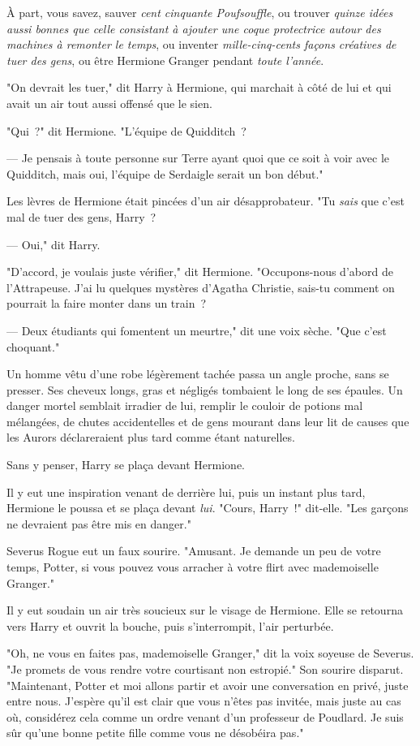 À part, vous savez, sauver \emph{cent cinquante Poufsouffle}, ou trouver \emph{quinze idées aussi bonnes que celle consistant à ajouter une coque protectrice autour des machines à remonter le temps}, ou inventer \emph{mille-cinq-cents façons créatives de tuer des gens}, ou être Hermione Granger pendant \emph{toute l'année}.

"On devrait les tuer," dit Harry à Hermione, qui marchait à côté de lui et qui avait un air tout aussi offensé que le sien.

"Qui~?" dit Hermione. "L'équipe de Quidditch~?

--- Je pensais à toute personne sur Terre ayant quoi que ce soit à voir avec le Quidditch, mais oui, l'équipe de Serdaigle serait un bon début."

Les lèvres de Hermione était pincées d'un air désapprobateur. "Tu \emph{sais} que c'est mal de tuer des gens, Harry~?

--- Oui," dit Harry.

"D'accord, je voulais juste vérifier," dit Hermione. "Occupons-nous d'abord de l'Attrapeuse. J'ai lu quelques mystères d'Agatha Christie, sais-tu comment on pourrait la faire monter dans un train~?

--- Deux étudiants qui fomentent un meurtre," dit une voix sèche. "Que c'est choquant."

Un homme vêtu d’une robe légèrement tachée passa un angle proche, sans se presser. Ses cheveux longs, gras et négligés tombaient le long de ses épaules. Un danger mortel semblait irradier de lui, remplir le couloir de potions mal mélangées, de chutes accidentelles et de gens mourant dans leur lit de causes que les Aurors déclareraient plus tard comme étant naturelles.

Sans y penser, Harry se plaça devant Hermione.

Il y eut une inspiration venant de derrière lui, puis un instant plus tard, Hermione le poussa et se plaça devant \emph{lui}. "Cours, Harry~!" dit-elle. "Les garçons ne devraient pas être mis en danger."

Severus Rogue eut un faux sourire. "Amusant. Je demande un peu de votre temps, Potter, si vous pouvez vous arracher à votre flirt avec mademoiselle Granger."

Il y eut soudain un air très soucieux sur le visage de Hermione. Elle se retourna vers Harry et ouvrit la bouche, puis s'interrompit, l'air perturbée.

"Oh, ne vous en faites pas, mademoiselle Granger," dit la voix soyeuse de Severus. "Je promets de vous rendre votre courtisant non estropié." Son sourire disparut. "Maintenant, Potter et moi allons partir et avoir une conversation en privé, juste entre nous. J'espère qu'il est clair que vous n'êtes pas invitée, mais juste au cas où, considérez cela comme un ordre venant d'un professeur de Poudlard. Je suis sûr qu'une bonne petite fille comme vous ne désobéira pas."

